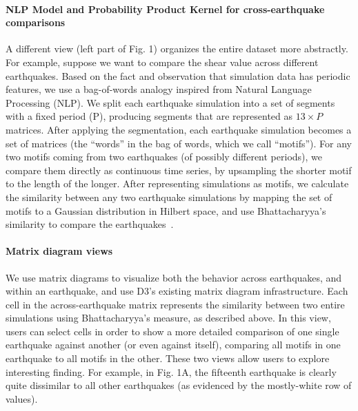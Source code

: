 \paragraph*{NLP Model and Probability Product Kernel for cross-earthquake comparisons}
\label{sec:method}
A different view (left part of Fig. 1) organizes the entire dataset more abstractly. For example, suppose we want to compare the shear value across different earthquakes. Based on the fact and observation that simulation data has periodic features, we use a bag-of-words analogy inspired from Natural Language Processing (NLP). We split each earthquake simulation into a set of segments with a fixed period (P), producing segments that are represented as  $13 \times P$ matrices. After applying the segmentation, each earthquake simulation becomes a set of matrices (the ``words'' in the bag of words, which we call ``motifs''). For any two motifs coming from two earthquakes (of possibly different periods), we compare them directly as continuous time series, by upsampling the shorter motif to the length of the longer. After representing simulations as motifs, we calculate the similarity between any two earthquake simulations by mapping the set of motifs to a Gaussian distribution in Hilbert space, and use Bhattacharyya's similarity to compare the earthquakes~\cite{conf/icml/KondorJ03}.

\paragraph*{Matrix diagram views}
\label{matrixvis}
We use matrix diagrams to visualize both the behavior across earthquakes, and within an earthquake, and use D3's existing matrix diagram infrastructure. Each cell in the across-earthquake matrix represents the similarity between two entire simulations using Bhattacharyya's measure, as described above. In this view, users can select cells in order to show a more detailed comparison of one single earthquake against another (or even against itself), comparing all motifs in one earthquake to all motifs in the other. These two views allow users to explore interesting finding. For example, in Fig. 1A, the fifteenth earthquake is clearly quite dissimilar to all other earthquakes (as evidenced by the mostly-white row of values).


